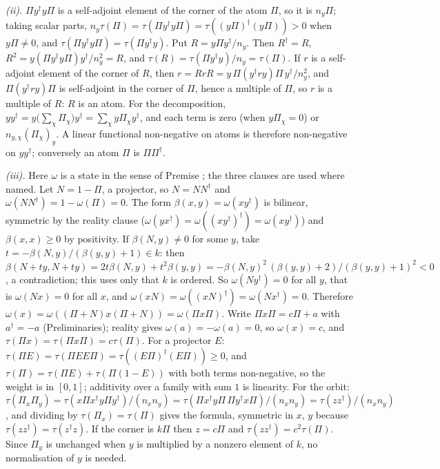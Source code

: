 \emph{(ii).} $\Pi y^{\dagger}y\Pi$ is a self-adjoint element of the corner of the atom $\Pi$, so it is $n_{y}\Pi$; taking scalar parts, $n_{y}\tau(\Pi) = \tau(\Pi y^{\dagger}y\Pi) = \tau((y\Pi)^{\dagger}(y\Pi)) > 0$ when $y\Pi \ne 0$, and $\tau(\Pi y^{\dagger}y\Pi) = \tau(\Pi y^{\dagger}y)$. Put $R = y\Pi y^{\dagger}/n_{y}$. Then $R^{\dagger} = R$, $R^{2} = y(\Pi y^{\dagger}y\Pi)y^{\dagger}/n_{y}^{2} = R$, and $\tau(R) = \tau(\Pi y^{\dagger}y)/n_{y} = \tau(\Pi)$. If $r$ is a self-adjoint element of the corner of $R$, then $r = RrR = y\,\Pi(y^{\dagger}ry)\Pi\,y^{\dagger}/n_{y}^{2}$, and $\Pi(y^{\dagger}ry)\Pi$ is self-adjoint in the corner of $\Pi$, hence a multiple of $\Pi$, so $r$ is a multiple of $R$: $R$ is an atom. For the decomposition, $yy^{\dagger} = y\bigl(\sum_{\chi}\Pi_{\chi}\bigr)y^{\dagger} = \sum_{\chi}y\Pi_{\chi}y^{\dagger}$, and each term is zero (when $y\Pi_{\chi} = 0$) or $n_{y,\chi}(\Pi_{\chi})_{y}$. A linear functional non-negative on atoms is therefore non-negative on $yy^{\dagger}$; conversely an atom $\Pi$ is $\Pi\Pi^{\dagger}$.

\emph{(iii).} Here $\omega$ is a state in the sense of Premise ; the three clauses are used where named. Let $N = 1 - \Pi$, a projector, so $N = NN^{\dagger}$ and $\omega(NN^{\dagger}) = 1 - \omega(\Pi) = 0$. The form $\beta(x,y) = \omega(xy^{\dagger})$ is bilinear, symmetric by the reality clause ($\omega(yx^{\dagger}) = \omega((xy^{\dagger})^{\dagger}) = \omega(xy^{\dagger})$) and $\beta(x,x) \ge 0$ by positivity. If $\beta(N,y) \ne 0$ for some $y$, take $t = -\beta(N,y)/(\beta(y,y) + 1) \in k$: then $\beta(N + ty, N + ty) = 2t\beta(N,y) + t^{2}\beta(y,y) = -\beta(N,y)^{2}\,(\beta(y,y) + 2)/(\beta(y,y) + 1)^{2} < 0$, a contradiction; this uses only that $k$ is ordered. So $\omega(Ny^{\dagger}) = 0$ for all $y$, that is $\omega(Nx) = 0$ for all $x$, and $\omega(xN) = \omega((xN)^{\dagger}) = \omega(Nx^{\dagger}) = 0$. Therefore $\omega(x) = \omega((\Pi + N)x(\Pi + N)) = \omega(\Pi x\Pi)$. Write $\Pi x\Pi = c\Pi + a$ with $a^{\dagger} = -a$ (Preliminaries); reality gives $\omega(a) = -\omega(a) = 0$, so $\omega(x) = c$, and $\tau(\Pi x) = \tau(\Pi x\Pi) = c\tau(\Pi)$. For a projector $E$: $\tau(\Pi E) = \tau(\Pi EE\Pi) = \tau((E\Pi)^{\dagger}(E\Pi)) \ge 0$, and $\tau(\Pi) = \tau(\Pi E) + \tau(\Pi(1 - E))$ with both terms non-negative, so the weight is in $[0,1]$; additivity over a family with sum $1$ is linearity. For the orbit: $\tau(\Pi_{x}\Pi_{y}) = \tau(x\Pi x^{\dagger}y\Pi y^{\dagger})/(n_{x}n_{y}) = \tau(\Pi x^{\dagger}y\Pi\,\Pi y^{\dagger}x\Pi)/(n_{x}n_{y}) = \tau(zz^{\dagger})/(n_{x}n_{y})$, and dividing by $\tau(\Pi_{x}) = \tau(\Pi)$ gives the formula, symmetric in $x$, $y$ because $\tau(zz^{\dagger}) = \tau(z^{\dagger}z)$. If the corner is $k\Pi$ then $z = c\Pi$ and $\tau(zz^{\dagger}) = c^{2}\tau(\Pi)$. Since $\Pi_{y}$ is unchanged when $y$ is multiplied by a nonzero element of $k$, no normalisation of $y$ is needed.

